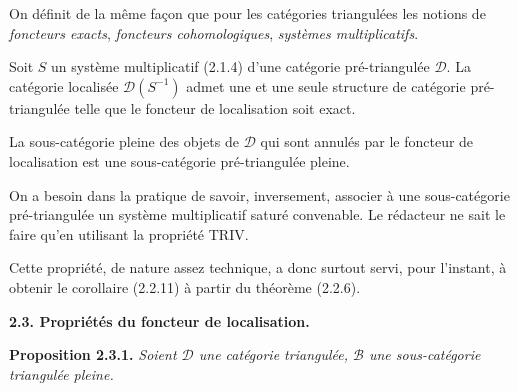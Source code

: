 On définit de la même façon que pour les catégories triangulées les notions
de \emph{foncteurs exacts}, \emph{foncteurs cohomologiques},
\emph{systèmes multiplicatifs}.

Soit $S$ un système multiplicatif (2.1.4) d'une catégorie pré-triangulée
$\mathcal D$. La catégorie localisée $\mathcal D(S^{-1})$ admet une et une
seule structure de catégorie pré-triangulée telle que le foncteur de
localisation soit exact.

La sous-catégorie pleine des objets de $\mathcal D$ qui sont annulés par le
foncteur de localisation est une sous-catégorie pré-triangulée pleine.

On a besoin dans la pratique de savoir, inversement, associer à une
sous-catégorie pré-triangulée un système multiplicatif saturé convenable.
Le rédacteur ne sait le faire qu'en utilisant la propriété TRIV.

Cette propriété, de nature assez technique, a donc surtout servi, pour
l'instant, à obtenir le corollaire (2.2.11) à partir du théorème (2.2.6).

\medskip
\noindent\textbf{2.3. Propriétés du foncteur de localisation.}

\smallskip
\noindent\textbf{Proposition 2.3.1.}\quad
\itshape Soient $\mathcal D$ une catégorie triangulée,
$\mathcal B$ une sous-catégorie triangulée pleine.\upshape

\endgroup

